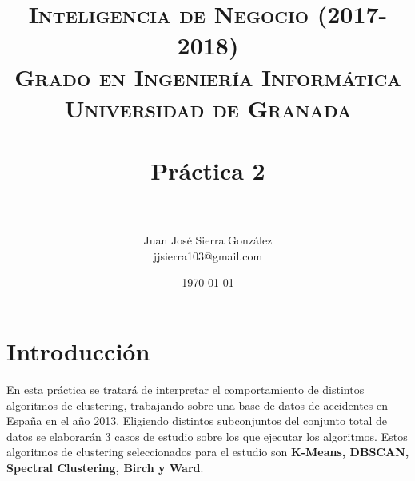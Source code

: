 

\title{	
	\normalfont \normalsize 
	\textsc{\textbf{Inteligencia de Negocio (2017-2018)} \\ Grado en Ingeniería Informática \\ Universidad de Granada} \\ [25pt] 
	\horrule{0.5pt} \\[0.4cm]
	\huge Práctica 2 \\
	\horrule{2pt} \\[0.5cm]
}

\author{Juan José Sierra González \\ jjsierra103@gmail.com}

\date{\normalsize\today}


	\maketitle
	\thispagestyle{empty}
	
	\newpage
	
	\tableofcontents
	
	\listoffigures
	
	\listoftables
	
	\newpage
	
	\section{Introducción}
	En esta práctica se tratará de interpretar el comportamiento de distintos algoritmos de clustering, trabajando sobre una base de datos de accidentes en España en el año 2013. Eligiendo distintos subconjuntos del conjunto total de datos se elaborarán 3 casos de estudio sobre los que ejecutar los algoritmos. Estos algoritmos de clustering seleccionados para el estudio son \textbf{K-Means, DBSCAN, Spectral Clustering, Birch y Ward}.
	
